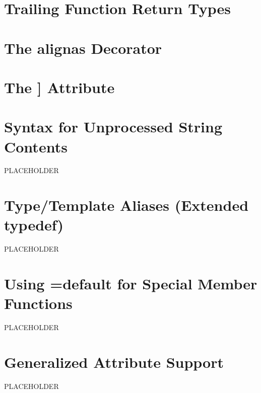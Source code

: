 \newpage
\section[Trailing Return]{Trailing Function Return Types}\label{trailing-function-return-types}
\setcounter{table}{0}
\setcounter{footnote}{0}
\setcounter{lstlisting}{0}



\newpage
\section[{\tt alignas}]{The {\SecCode alignas} Decorator}\label{alignas}
\setcounter{table}{0}
\setcounter{footnote}{0}
\setcounter{lstlisting}{0}


\newpage
\section[{\tt deprecated}]{The {\SecCode [[deprecated]]} Attribute}\label{deprecated}\label{the-standard-[[deprecated]]-attribute}
\setcounter{table}{0}
\setcounter{footnote}{0}
\setcounter{lstlisting}{0}


\newpage
\section[Raw String Literals '14]{Syntax for Unprocessed String Contents}
\setcounter{table}{0}
\setcounter{footnote}{0}
\setcounter{lstlisting}{0}
PLACEHOLDER

\newpage
\section[{\tt using} Aliases]{Type/Template Aliases (Extended {\SecCode typedef})}\label{alias-declarations-and-alias-templates}
PLACEHOLDER

\newpage
\section[Defaulted Functions]{Using {\SecCode =default} for Special Member Functions}\label{Defaulted-Special-Member-Functions}\label{defaulted-special-member-functions}
PLACEHOLDER

\newpage
\section[Attribute Syntax]{Generalized Attribute Support}\label{attributes}
PLACEHOLDER




